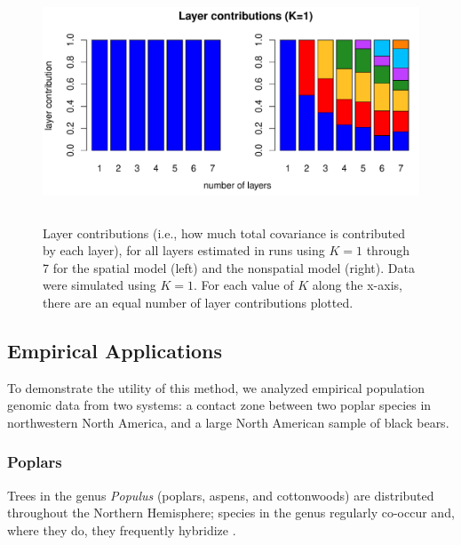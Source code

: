 \documentclass[12pt]{article}
\begin{document}
\begin{figure}
	\centering
		{\includegraphics[width=5in,height=2.5in]{figs/sims/simK1_laycon_barplots.pdf}}
		\caption{
			Layer contributions (i.e., how much total covariance is contributed by each layer), 
			for all layers estimated in runs using $K = 1$ through 7 
			for the spatial model (left) and the nonspatial model (right).
			Data were simulated using $K=1$.
			For each value of $K$ along the x-axis, there are an equal number of layer contributions plotted.
		}\label{simK1_laycon}
\end{figure}

\subsection*{Empirical Applications}
To demonstrate the utility of this method, we analyzed empirical population genomic data from two systems:
a contact zone between two poplar species in northwestern North America,
and a large North American sample of black bears.

\subsubsection*{Poplars}

Trees in the genus \textit{Populus} (poplars, aspens, and cottonwoods) 
are distributed throughout the Northern Hemisphere;
species in the genus regularly co-occur and, 
where they do, they frequently hybridize \citep{eckenwalder1984, Cronk2005}.
\end{document}
